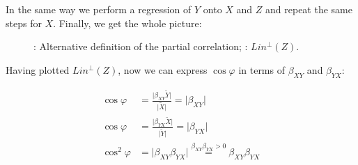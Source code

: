 In the same way we perform a regression of $Y$ onto $X$ and $Z$ and repeat the
same steps for $X$. Finally, we get the whole picture:

\begin{figure}[ht!]
\begin{center}
\caption{: Alternative definition of the partial correlation;
: $Lin^{\perp}(Z)$.}
\end{center}
\end{figure}

Having plotted $Lin^{\perp}(Z)$, now we can express $\cos \varphi$ in terms of $\beta_{XY}$
and $\beta_{YX}$:

\begin{equation*}%
\begin{split}
\cos \varphi &= \frac{\vert \beta_{XY} \widetilde Y \vert}{\vert \widetilde X \vert} = \vert \beta_{XY} \vert \\
\cos \varphi &= \frac{\vert \beta_{YX} \widetilde X \vert}{\vert \widetilde Y \vert} = \vert \beta_{YX} \vert \\
\cos^2 \varphi &= \vert \beta_{XY} \beta_{YX} \vert \stackrel{\beta_{XY} \beta_{YX} > 0}{=} \beta_{XY} \beta_{YX}
\end{split}
\end{equation*}

